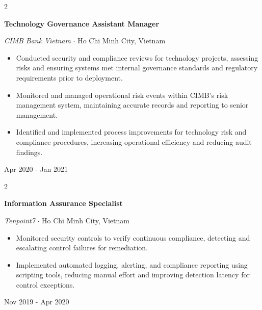 \documentclass[10pt, letterpaper]{article}
\newenvironment{highlights}{
    \begin{itemize}[
        topsep=0.08 cm,
        parsep=0.08 cm,
        partopsep=0pt,
        itemsep=0.05 cm,
        leftmargin=0 cm + 12pt
    ]
}{
    \end{itemize}
}
\newenvironment{twocolentry}[2][]{
    \onecolentry
    \def\secondColumn{#2}
    \setcolumnwidth{\fill, 4.8 cm}
    \begin{paracol}{2}
}{
    \switchcolumn \raggedleft \color{primaryColor}\small\secondColumn
    \end{paracol}
    \endonecolentry
}
\begin{document}
    \vspace{0.15 cm}

    \begin{twocolentry}{
        Apr 2020 - Jan 2021
    }
        \textbf{\color{primaryColor}Technology Governance Assistant Manager}

        \textit{CIMB Bank Vietnam} $\cdot$ Ho Chi Minh City, Vietnam

        \begin{highlights}
            \item Conducted security and compliance reviews for technology projects, assessing risks and ensuring systems met internal governance standards and regulatory requirements prior to deployment.
            \item Monitored and managed operational risk events within CIMB's risk management system, maintaining accurate records and reporting to senior management.
            \item Identified and implemented process improvements for technology risk and compliance procedures, increasing operational efficiency and reducing audit findings.
        \end{highlights}
    \end{twocolentry}

    \vspace{0.15 cm}

    \begin{twocolentry}{
        Nov 2019 - Apr 2020
    }
        \textbf{\color{primaryColor}Information Assurance Specialist}

        \textit{Tenpoint7} $\cdot$ Ho Chi Minh City, Vietnam

        \begin{highlights}
            \item Monitored security controls to verify continuous compliance, detecting and escalating control failures for remediation.
            \item Implemented automated logging, alerting, and compliance reporting using scripting tools, reducing manual effort and improving detection latency for control exceptions.
        \end{highlights}
    \end{twocolentry}

    \vspace{0.15 cm}
\end{document}
